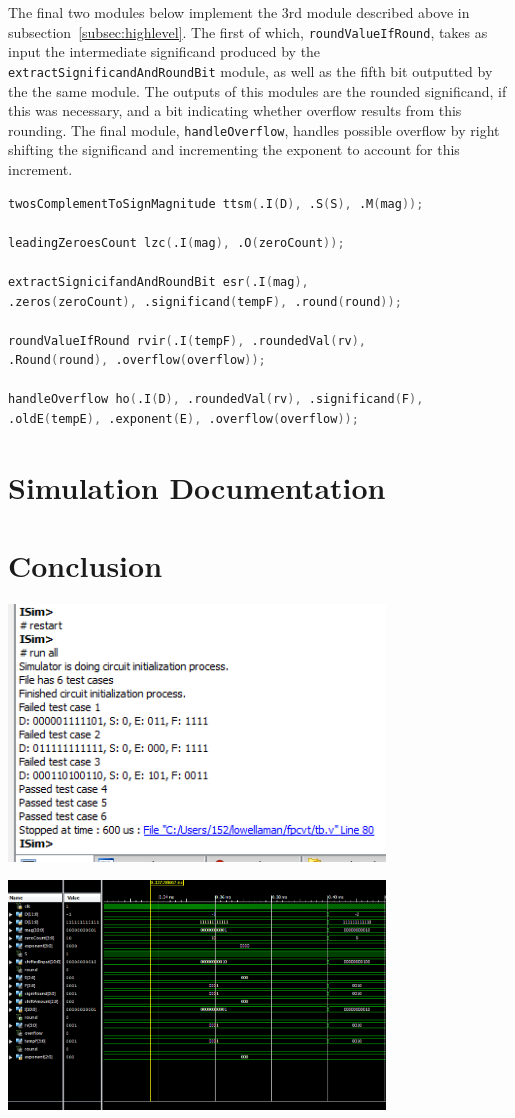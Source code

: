 \documentclass[]{article}
\begin{document}
The final two modules below implement the 3rd module described above in subsection~\ref{subsec:highlevel}. The first of which, \texttt{roundValueIfRound}, takes as input the intermediate significand produced by the \texttt{extractSignificand\-AndRoundBit} module, as well as the fifth bit outputted by the the same module. The outputs of this modules are the rounded significand, if this was necessary, and a bit indicating whether overflow results from this rounding. The final module, \texttt{handleOverflow}, handles possible overflow by right shifting the significand and incrementing the exponent to account for this increment.

\begin{lstlisting}[frame=single, language=verilog, caption= Excerpt from main \texttt{fpcvt.v} module.]
twosComplementToSignMagnitude ttsm(.I(D), .S(S), .M(mag));
    
leadingZeroesCount lzc(.I(mag), .O(zeroCount));
    
extractSignicifandAndRoundBit esr(.I(mag), 
.zeros(zeroCount), .significand(tempF), .round(round));

roundValueIfRound rvir(.I(tempF), .roundedVal(rv), 
.Round(round), .overflow(overflow));

handleOverflow ho(.I(D), .roundedVal(rv), .significand(F), 
.oldE(tempE), .exponent(E), .overflow(overflow));
\end{lstlisting}



\section{Simulation Documentation}
\section{Conclusion}


\includegraphics[width=10cm]{output.PNG}

\includegraphics[width=10cm]{waveform.PNG}




\end{document}
